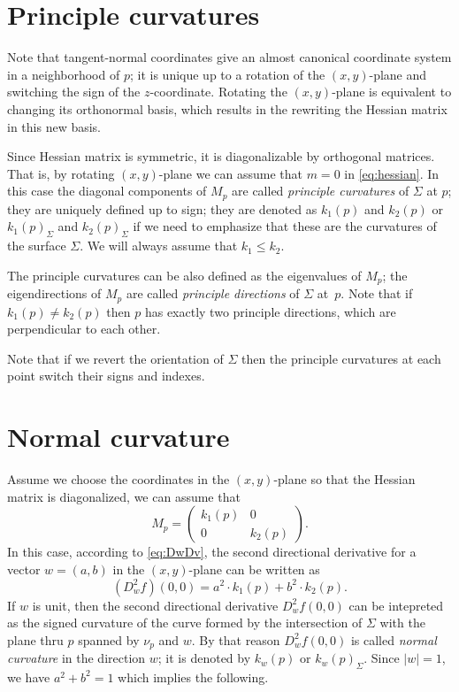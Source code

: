 \section*{Principle curvatures}

Note that tangent-normal coordinates give an almost canonical coordinate system in a neighborhood of $p$;
it is unique up to a rotation of  the $(x,y)$-plane and switching the sign of the $z$-coordinate.
Rotating the $(x,y)$-plane is equivalent to changing its orthonormal basis, which results in the rewriting   
the Hessian matrix in this new basis.

Since Hessian matrix is symmetric, it is diagonalizable by orthogonal matrices. %
That is, by rotating $(x,y)$-plane we can assume that $m=0$ in \ref{eq:hessian}. %
In this case the diagonal components of $M_p$ are called \emph{principle curvatures} of $\Sigma$ at $p$;
they are uniquely defined up to sign;
they are denoted as $k_1(p)$ and $k_2(p)$ or $k_1(p)_\Sigma$ and $k_2(p)_\Sigma$ if we need to emphasize that these are the curvatures of the surface $\Sigma$.
We will always assume that $k_1\le k_2$.

The principle curvatures can be also defined as the eigenvalues of $M_p$;
the eigendirections of $M_p$ are called \emph{principle directions} of $\Sigma$ at~$p$.
Note that if $k_1(p)\ne k_2(p)$ then $p$ has exactly two principle directions, which are perpendicular to each other.

Note that if we revert the orientation of $\Sigma$ then the principle curvatures at each point switch their signs and indexes.

\section*{Normal curvature}

Assume we choose the coordinates in the $(x,y)$-plane so that the Hessian matrix is diagonalized, we can assume that
\[M_p=\begin{pmatrix}
   k_1(p)
   &0
   \\
   0
   &k_2(p)
  \end{pmatrix}.
\]
In this case, according to \ref{eq:DwDv}, the second directional derivative
for a vector $w=(a,b)$ in the $(x,y)$-plane can be written as 
\[
(D^2_wf)(0,0)=a^2\cdot k_1(p) +b^2\cdot k_2(p).
\]
If $w$ is unit, then the second directional derivative $D^2_wf(0,0)$ can be intepreted as the signed curvature of the curve formed by the intersection of $\Sigma$ with the plane thru $p$ spanned by $\nu_p$ and $w$.
By that reason $D^2_wf(0,0)$ is called \emph{normal curvature} in the direction $w$;
it is denoted by $k_w(p)$ or $k_w(p)_\Sigma$.
Since $|w|=1$, we have $a^2+b^2=1$ which implies the following.

